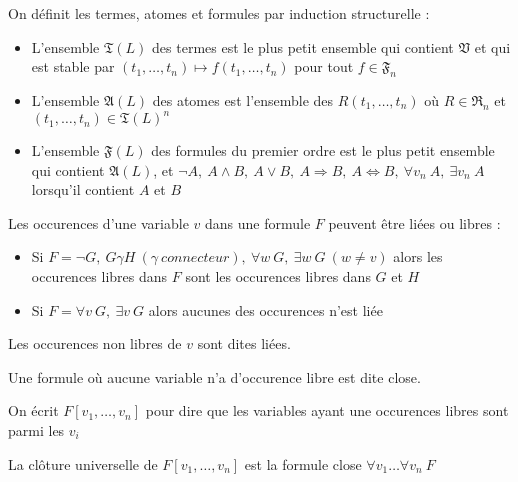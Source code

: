 \documentclass[9pt]{beamer}
\begin{document}
\begin{frame}
\begin{definition}
  On définit les termes, atomes et formules par induction structurelle :
  \begin{itemize}
  \item L'ensemble $\mathfrak{T}(L)$ des termes est le plus petit ensemble qui contient $\mathfrak{V}$ et qui est stable par $(t_1,\dots,t_n) \mapsto f(t_1,\dots,t_n)$ pour tout $f \in \mathfrak{F}_n$
  \item L'ensemble $\mathfrak{A}(L)$ des atomes est l'ensemble des $R(t_1,\dots,t_n)$ où $R \in \mathfrak{R}_n$ et $(t_1,\dots,t_n) \in \mathfrak{T}(L)^n$
  \item L'ensemble $\mathfrak{F}(L)$ des formules du premier ordre est le plus petit ensemble qui contient $\mathfrak{A}(L)$, et $\neg A,\ A\wedge B,\ A\vee B,\ A\Rightarrow B,\ A\Leftrightarrow B,\ \forall v_n\ A,\ \exists v_n\ A$ lorsqu'il contient $A$ et $B$
  \end{itemize}
\end{definition}
\end{frame}

\begin{frame}
\begin{definition}
  Les occurences d'une variable $v$ dans une formule $F$ peuvent être liées ou libres :
  \begin{itemize}
  \item Si $F = \neg G,\ G\gamma H\ (\gamma\ connecteur),\ \forall w\ G,\ \exists w\ G\ (w \neq v)$ alors les occurences libres dans $F$ sont les occurences libres dans $G$ et $H$
  \item Si $F = \forall v\ G,\ \exists v\ G$ alors aucunes des occurences n'est liée
  \end{itemize}

  Les occurences non libres de $v$ sont dites liées.

  Une formule où aucune variable n'a d'occurence libre est dite close.

  On écrit $F[v_1,\dots,v_n]$ pour dire que les variables ayant une occurences libres sont parmi les $v_i$

  La clôture universelle de $F[v_1,\dots,v_n]$ est la formule close $\forall v_1\dots\forall v_n\ F$
\end{definition}
\end{frame}
\end{document}
